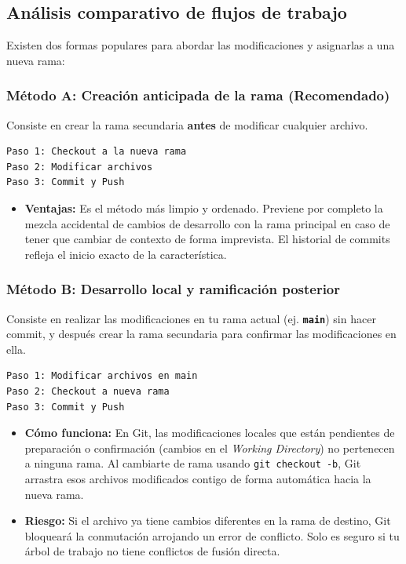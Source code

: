 \documentclass[
10pt, %
a4paper, %
oneside, %
headinclude,footinclude, %
BCOR5mm, %
]{scrartcl}
\begin{document}
\subsection{Análisis comparativo de flujos de trabajo}
Existen dos formas populares para abordar las modificaciones y asignarlas a una nueva rama:

\subsubsection{Método A: Creación anticipada de la rama (Recomendado)}
Consiste en crear la rama secundaria \textbf{antes} de modificar cualquier archivo.

\begin{verbatim}
Paso 1: Checkout a la nueva rama
Paso 2: Modificar archivos
Paso 3: Commit y Push
\end{verbatim}

\begin{itemize}
	\item \textbf{Ventajas:} Es el método más limpio y ordenado. Previene por completo la mezcla accidental de cambios de desarrollo con la rama principal en caso de tener que cambiar de contexto de forma imprevista. El historial de commits refleja el inicio exacto de la característica.
\end{itemize}

\subsubsection{Método B: Desarrollo local y ramificación posterior}
Consiste en realizar las modificaciones en tu rama actual (ej. \textbf{\texttt{main}}) sin hacer commit, y después crear la rama secundaria para confirmar las modificaciones en ella.

\begin{verbatim}
Paso 1: Modificar archivos en main
Paso 2: Checkout a nueva rama
Paso 3: Commit y Push
\end{verbatim}

\begin{itemize}
	\item \textbf{Cómo funciona:} En Git, las modificaciones locales que están pendientes de preparación o confirmación (cambios en el \textit{Working Directory}) no pertenecen a ninguna rama. Al cambiarte de rama usando \texttt{git checkout -b}, Git arrastra esos archivos modificados contigo de forma automática hacia la nueva rama.
	\item \textbf{Riesgo:} Si el archivo ya tiene cambios diferentes en la rama de destino, Git bloqueará la conmutación arrojando un error de conflicto. Solo es seguro si tu árbol de trabajo no tiene conflictos de fusión directa.
\end{itemize}
\end{document}

